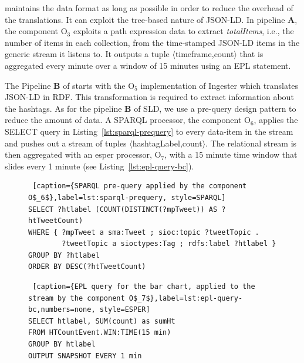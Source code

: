 \sti{} maintains the data format as long as possible in order to reduce the overhead of the translations. It can exploit the tree-based nature of JSON-LD. In pipeline \textbf{A}, the component O$_3$ exploits a path expression data to extract \textit{totalItems}, i.e., the number of items in each collection, from the time-stamped JSON-LD items in the generic stream it listens to. It outputs a tuple $\langle$timeframe,count$\rangle$ that is aggregated every minute over a window of 15 minutes using an EPL statement.

The Pipeline \textbf{B} of \sti{} starts with the O$_5$ implementation of \textsf{Ingester} which translates JSON-LD in RDF. This transformation is required to extract information about the hashtags. As for the pipeline \textbf{B} of SLD, we use a pre-query design pattern to reduce the amount of data. A SPARQL processor, the component O$_6$, applies the SELECT query in Listing~\ref{lst:sparql-prequery} to every data-item in the stream and pushes out a stream of tuples $\langle$hashtagLabel,count$\rangle$. The relational stream is then aggregated with an esper processor, O$_7$, with a 15 minute time window that slides every 1 minute (see Listing~\ref{lst:epl-query-bc}). 

\begin{figure}[ht]
\begin{minipage}{0.95\linewidth}
\centering
\begin{lstlisting} [caption={SPARQL pre-query applied by the component O$_6$},label=lst:sparql-prequery, style=SPARQL]
SELECT ?htlabel (COUNT(DISTINCT(?mpTweet)) AS ?htTweetCount) 
WHERE { ?mpTweet a sma:Tweet ; sioc:topic ?tweetTopic . 
        ?tweetTopic a sioctypes:Tag ; rdfs:label ?htlabel } 
GROUP BY ?htlabel 
ORDER BY DESC(?htTweetCount) 
\end{lstlisting}
\end{minipage}
\end{figure}

\begin{figure}[ht]
\begin{minipage}{0.95\linewidth}
\begin{lstlisting} [caption={EPL query for the bar chart, applied to the stream by the component O$_7$},label=lst:epl-query-bc,numbers=none, style=ESPER]
SELECT htlabel, SUM(count) as sumHt 
FROM HTCountEvent.WIN:TIME(15 min) 
GROUP BY htlabel 
OUTPUT SNAPSHOT EVERY 1 min 
\end{lstlisting}
\end{minipage}
\end{figure}

